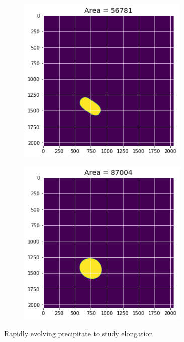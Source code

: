 \documentclass[12pt, a4paper]{report}
\begin{document}
\begin{figure}[H]
\begin{subfigure}{.24\textwidth}
  \label{img:microstrImg}
\end{subfigure}
\begin{subfigure}{.24\textwidth}
  \centering
  \includegraphics[width=0.9\textwidth]{Pictures/Growth/3.3.jpeg}
  \label{img:microstrImg}
\end{subfigure}
\begin{subfigure}{.24\textwidth}
  \centering
  \includegraphics[width=0.9\textwidth]{Pictures/Growth/3.4.jpeg}
  \label{img:microstrImg}
\end{subfigure}
\label{fig:test}
\caption{Rapidly evolving precipitate to study elongation }
\end{figure}
\end{document}
